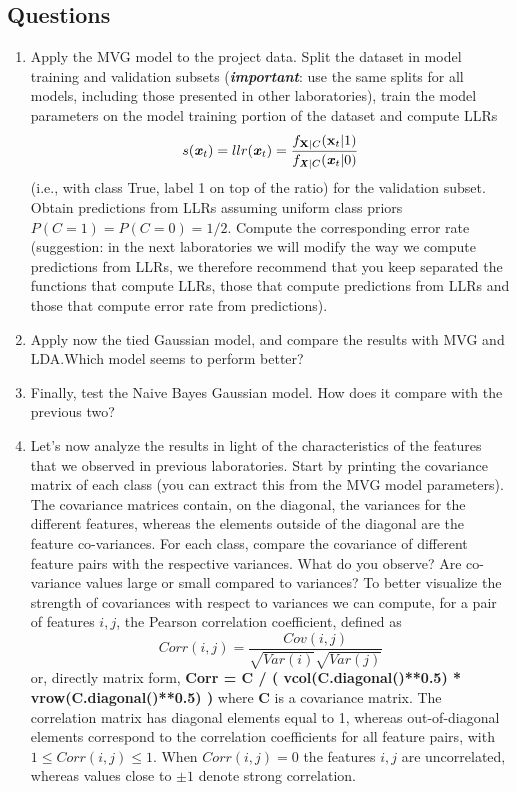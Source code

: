 \documentclass[a4paper, 12pt, english]{article}
\begin{document}
    \subsection{Questions}
    \begin{enumerate}
        \item Apply the MVG model to the project data. Split the dataset in model training and validation subsets (\textbf{\textit{important}}: use the same splits for all models, including those presented in other laboratories), train the model parameters on the model training portion of the dataset and compute LLRs
        \[ s(\textbf{\textit{x}}_t) = llr(\textbf{\textit{x}}_t) =\dfrac{f_{\textbf{X}|C}(\textbf{x}_t|1)}{f_{\textbf{\textit{X}}|C}(\textbf{\textit{x}}_t|0)}\]
        (i.e., with class True, label 1 on top of the ratio) for the validation subset. Obtain predictions from LLRs assuming uniform class priors \(P(C = 1) = P(C = 0) = 1/2 \). Compute the corresponding error rate (suggestion: in the next laboratories we will modify the way we compute predictions from LLRs, we therefore recommend that you keep separated the functions that compute LLRs, those that compute predictions from LLRs and those that compute error rate from predictions).
        \item Apply now the tied Gaussian model, and compare the results with MVG and LDA.\@ Which model seems to perform better?
        \item Finally, test the Naive Bayes Gaussian model. How does it compare with the previous two?
        \item Let's now analyze the results in light of the characteristics of the features that we observed in previous laboratories. Start by printing the covariance matrix of each class (you can extract this from the MVG model parameters). The covariance matrices contain, on the diagonal, the variances for the different features, whereas the elements outside of the diagonal are the feature co-variances. For each class, compare the covariance of different feature pairs with the respective variances. What do you observe? Are co-variance values large or small compared to variances? To better visualize the strength of covariances with respect to variances we can compute, for a pair of features \(i, j\), the Pearson correlation coefficient, defined as
        \[Corr(i,j) = \dfrac{Cov(i,j)}{\sqrt{Var(i)}\sqrt{Var(j)}}\]
        or, directly matrix form,
        \textbf{ Corr = C / ( vcol(C.diagonal()**0.5) * vrow(C.diagonal()**0.5) ) }
        where \textbf{C} is a covariance matrix. The correlation matrix has diagonal elements equal to 1, whereas out-of-diagonal elements correspond to the correlation coefficients for all feature pairs, with \(1 \le Corr(i,j) \le 1\). When \(Corr(i,j) = 0\) the features \(i,j\) are uncorrelated, whereas values close to \(\pm1\) denote strong correlation.

\end{enumerate}
\end{document}
